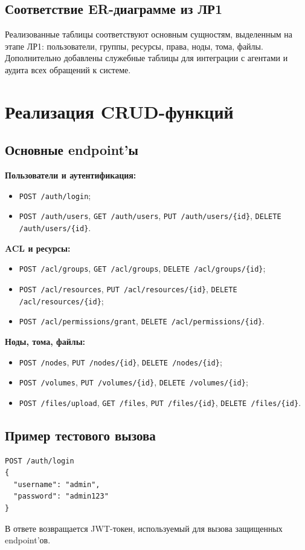 \documentclass[14pt,a4paper]{extarticle}
\begin{document}
\subsection{Соответствие ER-диаграмме из ЛР1}
Реализованные таблицы соответствуют основным сущностям, выделенным на этапе ЛР1:
пользователи, группы, ресурсы, права, ноды, тома, файлы.
Дополнительно добавлены служебные таблицы для интеграции с агентами и аудита всех обращений к системе.

\section{Реализация CRUD-функций}
\subsection{Основные endpoint'ы}
\textbf{Пользователи и аутентификация:}
\begin{itemize}
    \item \texttt{POST /auth/login};
    \item \texttt{POST /auth/users}, \texttt{GET /auth/users}, \texttt{PUT /auth/users/\{id\}}, \texttt{DELETE /auth/users/\{id\}}.
\end{itemize}

\textbf{ACL и ресурсы:}
\begin{itemize}
    \item \texttt{POST /acl/groups}, \texttt{GET /acl/groups}, \texttt{DELETE /acl/groups/\{id\}};
    \item \texttt{POST /acl/resources}, \texttt{PUT /acl/resources/\{id\}}, \texttt{DELETE /acl/resources/\{id\}};
    \item \texttt{POST /acl/permissions/grant}, \texttt{DELETE /acl/permissions/\{id\}}.
\end{itemize}

\textbf{Ноды, тома, файлы:}
\begin{itemize}
    \item \texttt{POST /nodes}, \texttt{PUT /nodes/\{id\}}, \texttt{DELETE /nodes/\{id\}};
    \item \texttt{POST /volumes}, \texttt{PUT /volumes/\{id\}}, \texttt{DELETE /volumes/\{id\}};
    \item \texttt{POST /files/upload}, \texttt{GET /files}, \texttt{PUT /files/\{id\}}, \texttt{DELETE /files/\{id\}}.
\end{itemize}

\subsection{Пример тестового вызова}
\begin{verbatim}
POST /auth/login
{
  "username": "admin",
  "password": "admin123"
}
\end{verbatim}
В ответе возвращается JWT-токен, используемый для вызова защищенных endpoint'ов.
\end{document}

